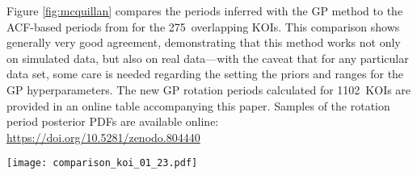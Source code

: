 \documentclass[a4paper,fleqn,usenatbib,useAMS]{mnras}
\newcommand{\response}[1]{{#1}}
\newcommand{\Kepler}{{\it Kepler}}
\newcommand{\nkoi}{1102}
\newcommand{\nkoimcq}{275}
\begin{document}
Figure \ref{fig:mcquillan} compares the periods inferred with the GP method to
the ACF-based periods from \citet{Mcquillan2013} for the \nkoimcq\ overlapping
KOIs.
This comparison shows generally very good agreement, demonstrating that this
method works not only on simulated data, but also on real data---with the
caveat that for any particular data set, some care is needed regarding the
setting the priors and ranges for the GP hyperparameters.
\response{The new GP rotation periods calculated for \nkoi\ KOIs are provided in an
online table accompanying this paper.
Samples of the rotation period posterior PDFs are available online:
\url{https://doi.org/10.5281/zenodo.804440}}


\begin{figure*}
\begin{center}
\texttt{[image: comparison\_koi\_01\_23.pdf]}
\caption[Comparison with McQuillan results.]
{A comparison of our GP rotation period measurements to those of
\citet{Mcquillan2013}.
The data points are coloured by the range of variability measured by
    \citet{Mcquillan2013}, defined as the interval between the 5th and 95th
    percentiles of normalised flux per period bin in millimagnitudes.}
\label{fig:mcquillan}
\end{center}
\end{figure*}
\end{document}
